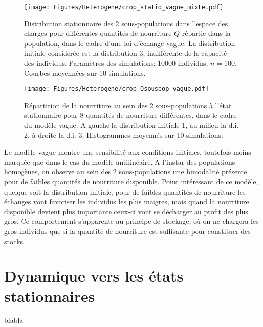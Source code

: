\begin{figure}[h!]
\centering
\texttt{[image: Figures/Heterogene/crop\_statio\_vague\_mixte.pdf]}
\caption{Distribution stationnaire des 2 sous-populations dans l'espace des charges pour différentes quantités de nourriture $Q$ répartie dans la population, dans le cadre d'une loi d'échange vague. La distribution initiale considérée est la distribution 3, indifférente de la capacité des individus. Paramètres des simulations: $10000$ individus, $n=100$. Courbes moyennées sur 10 simulations.}
\label{statio_vague_mixte}
\end{figure}


\begin{figure}[h!]
\centering
\texttt{[image: Figures/Heterogene/crop\_Qsouspop\_vague.pdf]}
\caption{Répartition de la nourriture au sein des 2 sous-populations à l'état stationnaire pour 8 quantités de nourriture différentes, dans le cadre du modèle vague. A gauche la distribution initiale 1, au milieu la d.i. 2, à droite la d.i. 3. Histogrammes moyennés sur 10 simulations.}
\label{Qsouspop_vague}
\end{figure}

Le modèle vague montre une sensibilité aux conditions initiales, toutefois moins marquée que dans le cas du modèle antilinéaire. A l'instar des populations homogènes, on observe au sein des 2 sous-populations une bimodalité présente pour de faibles quantités de nourriture disponible. Point intéressant de ce modèle, quelque soit la distribution initiale, pour de faibles quantités de nourriture les échanges vont favoriser les individus les plus maigres, mais quand la nourriture disponible devient plus importante ceux-ci vont se décharger au profit des plus gros. Ce comportement s'apparente au principe de stockage, où on ne chargera les gros individus que si la quantité de nourriture est suffisante pour constituer des stocks.

\section{Dynamique vers les états stationnaires}

blabla